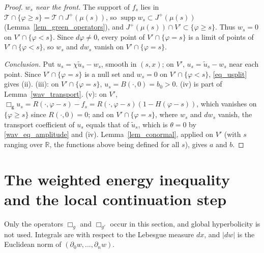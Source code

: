 \documentclass[11pt,a4paper,reqno]{amsart}
\theoremstyle{definition}
\numberwithin{equation}{section}
\newcommand{\R}{\mathbb{R}}
\newcommand{\cT}{\mathcal{T}}
\newcommand{\sg}{\mathsf{g}}
\newcommand{\supp}{\operatorname{supp}}
\begin{document}
\begin{proof}
\emph{$w_s$ near the front.} The support of $f_s$ lies in $\cT\cap\{\varphi\ge s\}=\cT\cap J^+(\mu(s))$, so
$\supp w_s\subset J^+(\mu(s))$ (Lemma~\ref{lem_green_operators}), and $J^+(\mu(s))\cap V'\subset\{\varphi\ge s\}$. Thus $w_s=0$ on
$V'\cap\{\varphi<s\}$. Since $d\varphi\ne0$, every point of $V'\cap\{\varphi=s\}$ is a limit of points of $V'\cap\{\varphi<s\}$,
so $w_s$ and $dw_s$ vanish on $V'\cap\{\varphi=s\}$.

\emph{Conclusion.} Put $u_s=\chi\tilde u_s-w_s$, smooth in $(s,x)$; on $V'$, $u_s=\tilde u_s-w_s$ near each point.
Since $V'\cap\{\varphi=s\}$ is a null set and $w_s=0$ on $V'\cap\{\varphi<s\}$, \eqref{eq_usplit} gives (ii). (iii):
on $V'\cap\{\varphi=s\}$, $u_s=B(\cdot,0)=b_0>0$. (iv) is part of Lemma~\ref{wav_transport}. (v): on $V'$,
$\Box_\sg u_s=R(\cdot,\varphi-s)-f_s=R(\cdot,\varphi-s)(1-H(\varphi-s))$, which vanishes on $\{\varphi\ge s\}$ since
$R(\cdot,0)=0$; and on $V'\cap\{\varphi=s\}$, where $w_s$ and $dw_s$ vanish, the transport coefficient of $u_s$ equals
that of $\tilde u_s$, which is $\theta=0$ by \eqref{wav_eq_amplitude} and (iv). Lemma~\ref{lem_conormal}, applied on $V'$
(with $s$ ranging over $\R$, the functions above being defined for all $s$), gives $a$ and $b$.
\end{proof}
\section{The weighted energy inequality and the local continuation step}\label{local}

Only the operators $\Box_g$ and $\Box_{g'}$ occur in this section, and global hyperbolicity is not used. Integrals are
with respect to the Lebesgue measure $dx$, and $|dw|$ is the Euclidean norm of $(\partial_0w,\dots,\partial_nw)$.
\end{document}
